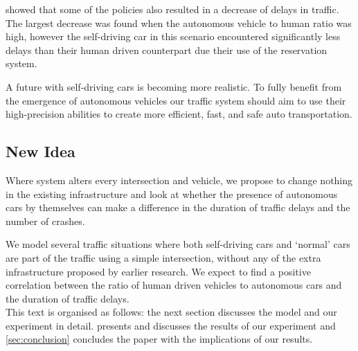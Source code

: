 \textcite{dresner2007sharing} showed that some of the policies also resulted in a decrease of delays in traffic. The largest decrease was found when the autonomous vehicle to human ratio was high, however the self-driving car in this scenario encountered significantly less delays than their human driven counterpart due their use of the reservation system.

A future with self-driving cars is becoming more realistic. To fully benefit from the emergence of autonomous vehicles our traffic system should aim to use their high-precision abilities to create more efficient, fast, and safe auto transportation.


\subsection{New Idea}
\label{sub:intro:new_idea}	
Where \textcite{dresner2007sharing} system alters every intersection and vehicle, we propose to change nothing in the existing infrastructure and look at whether the presence of autonomous cars by themselves can make a difference in the duration of traffic delays and the number of crashes. 

We model several traffic situations where both self-driving cars and `normal' cars are part of the traffic using a simple intersection, without any of the extra infrastructure proposed by earlier research. We expect to find a positive correlation between the ratio of human driven vehicles to autonomous cars and the duration of traffic delays.\\

This text is organised as follows: the next section discusses the model and our experiment in detail.  presents and discusses the results of our experiment and \cref{sec:conclusion} concludes the paper with the implications of our results.